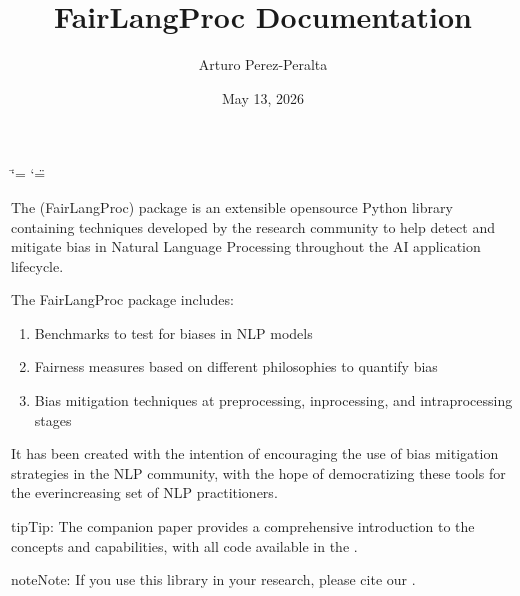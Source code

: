 \documentclass[letterpaper,10pt,english]{sphinxmanual}
\title{FairLangProc Documentation}
\date{May 13, 2026}
\author{Arturo Perez-Peralta}
\begin{document}
\ifdefined\shorthandoff
  \ifnum\catcode`\=\string=\active\shorthandoff{=}\fi
  \ifnum\catcode`\"=\active{}\fi
\fi

\pagestyle{empty}
\sphinxmaketitle
\pagestyle{plain}
\sphinxtableofcontents
\pagestyle{normal}
\label{\detokenize{index::doc}}


\sphinxAtStartPar
The  (FairLangProc) package is an extensible open\sphinxhyphen{}source Python library
containing techniques developed by the research community to help detect and mitigate bias in
Natural Language Processing throughout the AI application lifecycle.

\sphinxAtStartPar
The FairLangProc package includes:
\begin{enumerate}
%
\item {} 
\sphinxAtStartPar
{} \sphinxhyphen{} Benchmarks to test for biases in NLP models

\item {} 
\sphinxAtStartPar
{} \sphinxhyphen{} Fairness measures based on different philosophies to quantify bias

\item {} 
\sphinxAtStartPar
{} \sphinxhyphen{} Bias mitigation techniques at pre\sphinxhyphen{}processing, in\sphinxhyphen{}processing, and intra\sphinxhyphen{}processing stages

\end{enumerate}

\sphinxAtStartPar
It has been created with the intention of encouraging the use of bias mitigation strategies
in the NLP community, with the hope of democratizing these tools for the ever\sphinxhyphen{}increasing set
of NLP practitioners.

\begin{sphinxadmonition}{tip}{Tip:}
\sphinxAtStartPar
The companion paper provides a comprehensive introduction to the concepts and capabilities,
with all code available in the .
\end{sphinxadmonition}

\begin{sphinxadmonition}{note}{Note:}
\sphinxAtStartPar
If you use this library in your research, please cite our .
\end{sphinxadmonition}
\end{document}
